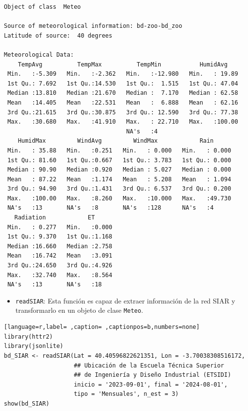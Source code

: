 \begin{verbatim}
Object of class  Meteo 

Source of meteorological information: bd-zoo-bd_zoo 
Latitude of source:  40 degrees

Meteorological Data:
    TempAvg          TempMax          TempMin           HumidAvg     
 Min.   :-5.309   Min.   :-2.362   Min.   :-12.980   Min.   : 19.89  
 1st Qu.: 7.692   1st Qu.:14.530   1st Qu.:  1.515   1st Qu.: 47.04  
 Median :13.810   Median :21.670   Median :  7.170   Median : 62.58  
 Mean   :14.405   Mean   :22.531   Mean   :  6.888   Mean   : 62.16  
 3rd Qu.:21.615   3rd Qu.:30.875   3rd Qu.: 12.590   3rd Qu.: 77.38  
 Max.   :30.680   Max.   :41.910   Max.   : 22.710   Max.   :100.00  
                                   NA's   :4                         
    HumidMax         WindAvg         WindMax            Rain       
 Min.   : 35.88   Min.   :0.251   Min.   : 0.000   Min.   : 0.000  
 1st Qu.: 81.60   1st Qu.:0.667   1st Qu.: 3.783   1st Qu.: 0.000  
 Median : 90.90   Median :0.920   Median : 5.027   Median : 0.000  
 Mean   : 87.22   Mean   :1.174   Mean   : 5.208   Mean   : 1.094  
 3rd Qu.: 94.90   3rd Qu.:1.431   3rd Qu.: 6.537   3rd Qu.: 0.200  
 Max.   :100.00   Max.   :8.260   Max.   :10.000   Max.   :49.730  
 NA's   :13       NA's   :8       NA's   :128      NA's   :4       
   Radiation            ET       
 Min.   : 0.277   Min.   :0.000  
 1st Qu.: 9.370   1st Qu.:1.168  
 Median :16.660   Median :2.758  
 Mean   :16.742   Mean   :3.091  
 3rd Qu.:24.650   3rd Qu.:4.926  
 Max.   :32.740   Max.   :8.564  
 NA's   :13       NA's   :18
\end{verbatim}

\begin{itemize}
\item \texttt{readSIAR}: Esta función es capaz de extraer información de la red SIAR y transformarlo en un objeto de clase \texttt{Meteo}.
\end{itemize}
\begin{lstlisting}[language=r,label= ,caption= ,captionpos=b,numbers=none]
library(httr2)
library(jsonlite)
bd_SIAR <- readSIAR(Lat = 40.40596822621351, Lon = -3.70038308516172,
                    ## Ubicación de la Escuela Técnica Superior
                    ## de Ingeniería y Diseño Industrial (ETSIDI)
                    inicio = '2023-09-01', final = '2024-08-01',
                    tipo = 'Mensuales', n_est = 3)
show(bd_SIAR)
\end{lstlisting}

